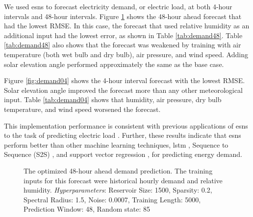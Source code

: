 We used \glspl{esn} to forecast electricity demand, or electric load, at both
4-hour intervals and 48-hour intervals. Figure \ref{fig:48demand} shows the
48-hour ahead forecast that had the lowest RMSE. In this case, the forecast
that used relative humidity as an additional input had the lowest error, as
shown in Table \ref{tab:demand48}. Table \ref{tab:demand48} also shows that the
forecast was weakened by training with air temperature (both wet bulb and dry
bulb), air pressure, and wind speed. Adding solar elevation angle performed
approximately the same as the base case.

Figure \ref{fig:demand04} shows the 4-hour interval forecast with the lowest
RMSE. Solar elevation angle improved the
forecast more than any other meteorological input. Table \ref{tab:demand04}
shows that humidity, air pressure, dry bulb temperature, and wind speed
worsened the forecast.

This implementation performance is consistent with previous applications
of \glspl{esn} to the task of predicting electric load
\cite{deihimi_application_2012}. Further, these results indicate that
\glspl{esn} perform better than other machine learning techniques, \gls{lstm} \cite{marino_building_2016}, Sequence to Sequence (S2S)
\cite{marino_building_2016}, and support vector regression \cite{chen_day-ahead_2017}, for predicting energy demand.

\begin{figure}[H]
  \centering
    \resizebox{\columnwidth}{!}{}
  \caption{The optimized 48-hour ahead demand prediction. The training inputs for this
  forecast were historical hourly demand and relative humidity. \textit{Hyperparameters}:
  Reservoir Size: 1500, Sparsity: 0.2, Spectral Radius: 1.5, Noise: 0.0007,
  Training Length: 5000, Prediction Window: 48, Random state: 85}
  \label{fig:48demand}
\end{figure}


